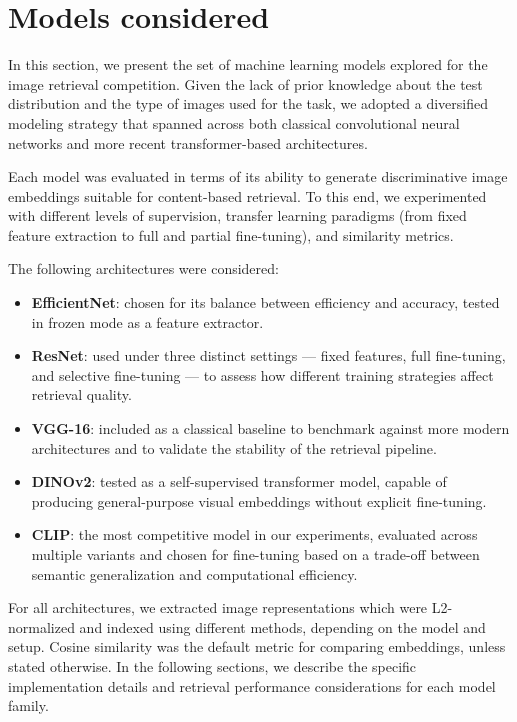 \section{Models considered}
\label{sec:formatting}


In this section, we present the set of machine learning models explored for the image retrieval competition. Given the lack of prior knowledge about the test distribution and the type of images used for the task, we adopted a diversified modeling strategy that spanned across both classical convolutional neural networks and more recent transformer-based architectures.

Each model was evaluated in terms of its ability to generate discriminative image embeddings suitable for content-based retrieval. To this end, we experimented with different levels of supervision, transfer learning paradigms (from fixed feature extraction to full and partial fine-tuning), and similarity metrics.

The following architectures were considered:
\begin{itemize}
  \item \textbf{EfficientNet}: chosen for its balance between efficiency and accuracy, tested in frozen mode as a feature extractor.
  \item \textbf{ResNet}: used under three distinct settings — fixed features, full fine-tuning, and selective fine-tuning — to assess how different training strategies affect retrieval quality.
  \item \textbf{VGG-16}: included as a classical baseline to benchmark against more modern architectures and to validate the stability of the retrieval pipeline.
  \item \textbf{DINOv2}: tested as a self-supervised transformer model, capable of producing general-purpose visual embeddings without explicit fine-tuning.
  \item \textbf{CLIP}: the most competitive model in our experiments, evaluated across multiple variants and chosen for fine-tuning based on a trade-off between semantic generalization and computational efficiency.
\end{itemize}

For all architectures, we extracted image representations which were L2-normalized and indexed using different methods, depending on the model and setup. Cosine similarity was the default metric for comparing embeddings, unless stated otherwise. In the following sections, we describe the specific implementation details and retrieval performance considerations for each model family.

